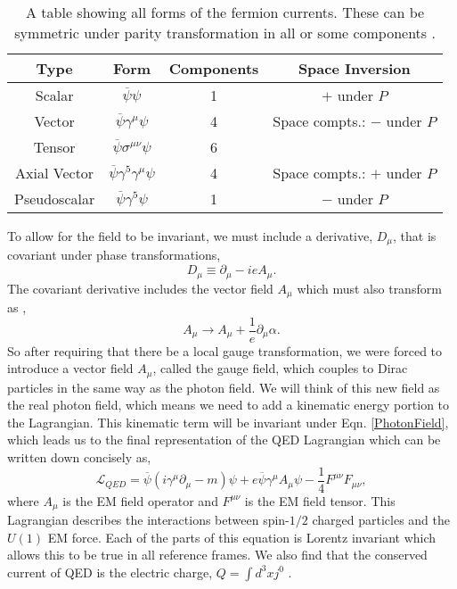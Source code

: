 \begin{table}
\centering
\begin{tabular}{|c|c|c|c|}
\hline
Type & Form & Components & Space Inversion \\
\hline
\hline
 Scalar &  $\overline{\psi}\psi$ &  1 & $+$ under $P$ \\
 Vector & $\overline{\psi}\gamma^\mu\psi$ & 4 & Space compts.: $-$ under $P$ \\
 Tensor & $\overline{\psi}\sigma^{\mu\nu}\psi$ & 6 &  \\
 Axial Vector & $\overline{\psi}\gamma^5\gamma^\mu\psi$ & 4 & Space compts.: $+$ under $P$ \\
 Pseudoscalar & $\overline{\psi}\gamma^5\psi$ & 1 & $-$ under $P$ \\
 \hline
\end{tabular}
\caption[Fermion Currents]{A table showing all forms of the fermion currents. These can be symmetric under parity transformation in all or some components \cite{halzen_quarks_1984}.}
\label{Transformations}
\end{table}

To allow for the field to be invariant, we must include a derivative, $D_\mu$, that is covariant under phase transformations,
 \begin{equation}\label{QEDCovariantD}
 D_\mu\equiv\partial_\mu-ieA_\mu.
 \end{equation}
 The covariant derivative includes the vector field $A_\mu$ which must also transform as \cite{halzen_quarks_1984, peskin_introduction_1995},
  \begin{equation}\label{PhotonField}
 A_\mu\rightarrow A_\mu+\frac{1}{e}\partial_\mu\alpha.
 \end{equation}
 So after requiring that there be a local gauge transformation, we were forced to introduce a vector field $A_\mu$, called the gauge field, which couples to Dirac particles in the same way as the photon field. We will think of this new field as the real photon field, which means we need to add a kinematic energy portion to the Lagrangian. This kinematic term will be invariant under Eqn. \ref{PhotonField}, which leads us to the final representation of the QED Lagrangian which can be written down concisely as, 
\begin{equation}\label{LagrangianQED}
\mathcal{L}_{QED}=\overline{\psi}(i\gamma^\mu\partial_\mu-m)\psi+e\overline{\psi}\gamma^{\mu}A_{\mu}\psi-\frac{1}{4}F^{\mu\nu}F_{\mu\nu},
\end{equation}
where $A_{\mu}$ is the EM field operator and $F^{\mu\nu}$ is the EM field tensor. This Lagrangian describes the interactions between spin-$1/2$ charged particles and the $U(1)$ EM force. Each of the parts of this equation is Lorentz invariant which allows this to be true in all reference frames. We also find that the conserved current of QED is the electric charge, $Q=\int d^3xj^0$ \cite{halzen_quarks_1984, peskin_introduction_1995}. 

